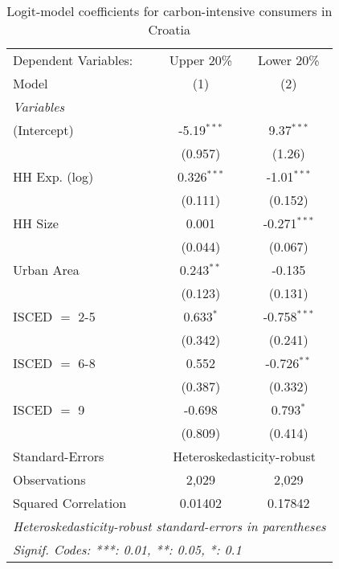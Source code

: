 
\begin{table}[htbp!]
   \centering
   \small
   \begin{adjustbox}{width = 1\textwidth, max height = 0.95\textheight, center}
      \begin{threeparttable}[b]
         \caption{\label{tab:Logit_1_HRV} Logit-model coefficients for carbon-intensive consumers in Croatia}
         \begin{tabular}{lcc}
            \tabularnewline \midrule \midrule
            Dependent Variables: & Upper 20\%    & Lower 20\%\\   
            Model                & (1)           & (2)\\  
            \midrule
            \emph{Variables}\\
            (Intercept)          & -5.19$^{***}$ & 9.37$^{***}$\\   
                                 & (0.957)       & (1.26)\\   
            HH Exp. (log)        & 0.326$^{***}$ & -1.01$^{***}$\\   
                                 & (0.111)       & (0.152)\\   
            HH Size              & 0.001         & -0.271$^{***}$\\   
                                 & (0.044)       & (0.067)\\   
            Urban Area           & 0.243$^{**}$  & -0.135\\   
                                 & (0.123)       & (0.131)\\   
            ISCED $=$ 2-5        & 0.633$^{*}$   & -0.758$^{***}$\\   
                                 & (0.342)       & (0.241)\\   
            ISCED $=$ 6-8        & 0.552         & -0.726$^{**}$\\   
                                 & (0.387)       & (0.332)\\   
            ISCED $=$ 9          & -0.698        & 0.793$^{*}$\\   
                                 & (0.809)       & (0.414)\\   
            \midrule 
            Standard-Errors & \multicolumn{2}{c}{Heteroskedasticity-robust} \\ 
            Observations         & 2,029         & 2,029\\  
            Squared Correlation  & 0.01402       & 0.17842\\  
            \midrule \midrule
            \multicolumn{3}{l}{\emph{Heteroskedasticity-robust standard-errors in parentheses}}\\
            \multicolumn{3}{l}{\emph{Signif. Codes: ***: 0.01, **: 0.05, *: 0.1}}\\
         \end{tabular}
         

\end{threeparttable}
\end{adjustbox}
\end{table}
